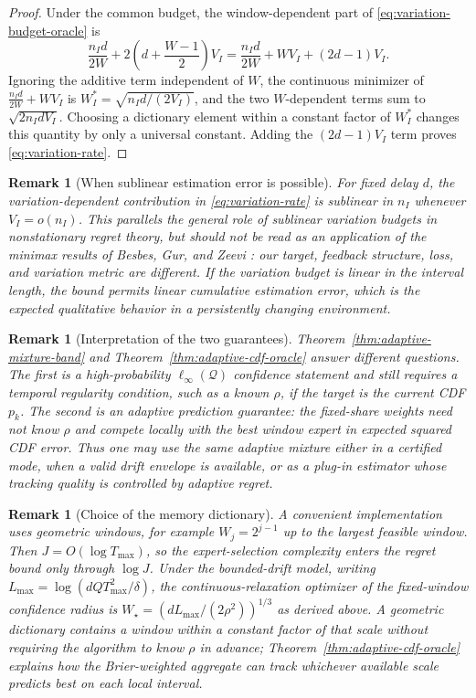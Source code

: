 \documentclass[11pt]{article}
\newtheorem{remark}[theorem]{Remark}
\newcommand{\Q}{\mathcal{Q}}
\newcommand{\1}{\mathbf{1}}
\begin{document}
\begin{proof}
Under the common budget, the window-dependent part of
\eqref{eq:variation-budget-oracle} is
\[
    \frac{n_I d}{2W}
    +
    2\left(d+\frac{W-1}{2}\right)V_I
    =
    \frac{n_I d}{2W}
    +
    WV_I
    +(2d-1)V_I.
\]
Ignoring the additive term independent of $W$, the continuous minimizer of
$\frac{n_Id}{2W}+WV_I$ is
$W_I^*=\sqrt{n_Id/(2V_I)}$, and the two $W$-dependent terms sum to
$\sqrt{2n_IdV_I}$.  Choosing a dictionary element within a constant factor of
$W_I^*$ changes this quantity by only a universal constant.  Adding the
$(2d-1)V_I$ term proves \eqref{eq:variation-rate}.
\end{proof}

\begin{remark}[When sublinear estimation error is possible]
For fixed delay $d$, the variation-dependent contribution in
\eqref{eq:variation-rate} is sublinear in $n_I$ whenever $V_I=o(n_I)$.
This parallels the general role of sublinear variation budgets in
nonstationary regret theory, but should not be read as an application of the
minimax results of Besbes, Gur, and Zeevi \cite{besbes2015}: our target,
feedback structure, loss, and variation metric are different.  If the
variation budget is linear in the interval length, the bound permits linear
cumulative estimation error, which is the expected qualitative behavior in a
persistently changing environment.
\end{remark}

\begin{remark}[Interpretation of the two guarantees]
Theorem~\ref{thm:adaptive-mixture-band} and
Theorem~\ref{thm:adaptive-cdf-oracle} answer different questions.  The first is
a high-probability $\ell_\infty(\Q)$ confidence statement and still requires a
temporal regularity condition, such as a known $\rho$, if the target is the
current CDF $p_k$.  The second is an adaptive prediction guarantee: the
fixed-share weights need not know $\rho$ and compete locally with the best
window expert in expected squared CDF error.  Thus one may use the same
adaptive mixture either in a certified mode, when a valid drift envelope is
available, or as a plug-in estimator whose tracking quality is controlled by
adaptive regret.
\end{remark}

\begin{remark}[Choice of the memory dictionary]
A convenient implementation uses geometric windows, for example
$W_j=2^{j-1}$ up to the largest feasible window.  Then $J=O(\log T_{\max})$,
so the expert-selection complexity enters the regret bound only through
$\log J$.  Under the bounded-drift model, writing
$L_{\max}=\log(dQ T_{\max}^2/\delta)$, the continuous-relaxation optimizer of
the fixed-window confidence radius is
$W_{\star}=(dL_{\max}/(2\rho^2))^{1/3}$ as derived above.  A geometric dictionary contains a
window within a constant factor of that scale without requiring the algorithm
to know $\rho$ in advance; Theorem~\ref{thm:adaptive-cdf-oracle} explains how
the Brier-weighted aggregate can track whichever available scale predicts best
on each local interval.
\end{remark}
\end{document}
